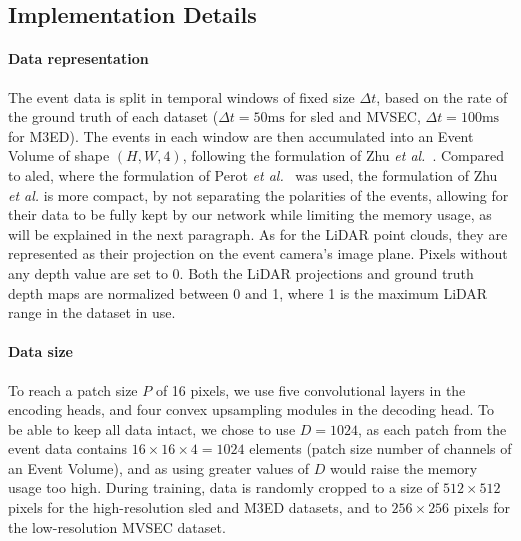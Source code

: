 \begin{table}[ht]
  \centering
  \caption{M3ED sets used within this chapter.}\label{tab:delta:split_m3ed}
\end{table}

\subsection{Implementation Details}
\paragraph{Data representation}\label{sec:delta:eval:impl_detail:data_repres}
The event data is split in temporal windows of fixed size \(\Delta t\), based on the rate of the ground truth of each dataset (\(\Delta t = 50\text{ms}\) for \acrshort{sled} and MVSEC, \(\Delta t = 100\text{ms}\) for M3ED). The events in each window are then accumulated into an Event Volume of shape \((H, W, 4)\), following the formulation of Zhu \textit{et al.}~\cite{Zhu2019UnsupervisedEL}. Compared to \acrshort{aled}, where the formulation of Perot \textit{et al.}~\cite{Perot2020LearningTD} was used, the formulation of Zhu \textit{et al.} is more compact, by not separating the polarities of the events, allowing for their data to be fully kept by our network while limiting the memory usage, as will be explained in the next paragraph. As for the LiDAR point clouds, they are represented as their projection on the event camera's image plane. Pixels without any depth value are set to 0. Both the LiDAR projections and ground truth depth maps are normalized between 0 and 1, where 1 is the maximum LiDAR range in the dataset in use.

\paragraph{Data size}
To reach a patch size \(P\) of 16 pixels, we use five convolutional layers in the encoding heads, and four convex upsampling modules in the decoding head. To be able to keep all data intact, we chose to use \mbox{\(D = 1024\)}, as each patch from the event data contains \(16 \times 16 \times 4 = 1024\) elements (patch size \texttimes{} number of channels of an Event Volume), and as using greater values of \(D\) would raise the memory usage too high. During training, data is randomly cropped to a size of \(512 \times 512\) pixels for the high-resolution \acrshort{sled} and M3ED datasets, and to \(256 \times 256\) pixels for the low-resolution MVSEC dataset.

